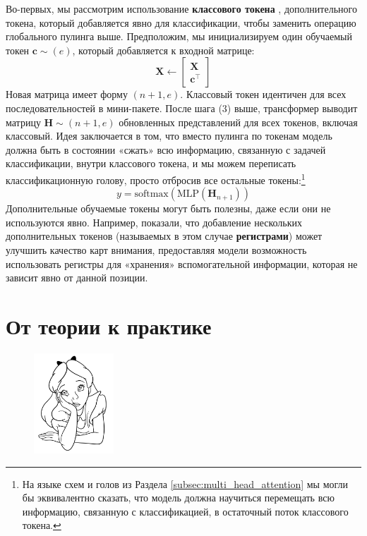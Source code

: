 Во-первых, мы рассмотрим использование \textbf{классового токена} \cite{dosovitskiy2020image}, дополнительного токена, который добавляется явно для классификации, чтобы заменить операцию глобального пулинга выше. Предположим, мы инициализируем один обучаемый токен $\mathbf{c} \sim (e)$, который добавляется к входной матрице:
%
$$
\mathbf{X} \leftarrow\begin{bmatrix}\mathbf{X} \\ \mathbf{c}^\top \end{bmatrix}
$$
%
Новая матрица имеет форму $(n+1, e)$. Классовый токен идентичен для всех последовательностей в мини-пакете. После шага (3) выше, трансформер выводит матрицу $\mathbf{H} \sim (n+1,e)$ обновленных представлений для всех токенов, включая классовый. Идея заключается в том, что вместо пулинга по токенам модель должна быть в состоянии «сжать» всю информацию, связанную с задачей классификации, внутри классового токена, и мы можем переписать классификационную голову, просто отбросив все остальные токены:\footnote{На языке схем и голов из Раздела \ref{subsec:multi_head_attention} мы могли бы эквивалентно сказать, что модель должна научиться перемещать всю информацию, связанную с классификацией, в остаточный поток классового токена.}
%
$$
y=\text{softmax}\left(\text{MLP}\left(\mathbf{H}_{n+1}\right)\right)
$$
%
Дополнительные обучаемые токены могут быть полезны, даже если они не используются явно. Например, \cite{darcet2023vision} показали, что добавление нескольких дополнительных токенов (называемых в этом случае \textbf{регистрами}) может улучшить качество карт внимания, предоставляя модели возможность использовать регистры для «хранения» вспомогательной информации, которая не зависит явно от данной позиции.

\section*{От теории к практике}

\begin{figure}
\vspace{-6em}\includegraphics[width=3.0cm]{images/shutterstock_2075221579.jpg}
\vspace{-4em}
\end{figure}

